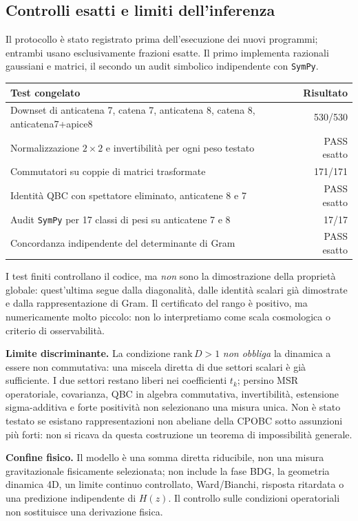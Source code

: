\documentclass[11pt,a4paper]{article}
\begin{document}
\subsection*{Controlli esatti e limiti dell'inferenza}
Il protocollo \`e stato registrato prima dell'esecuzione dei nuovi programmi; entrambi usano esclusivamente frazioni esatte. Il primo implementa razionali gaussiani e matrici, il secondo un audit simbolico indipendente con \texttt{SymPy}.
\begin{center}
\small
\begin{tabular}{p{8.4cm}r}
\toprule
Test congelato & Risultato\\
\midrule
Downset di anticatena 7, catena 7, anticatena 8, catena 8, anticatena7+apice8 & 530/530\\
Normalizzazione $2\times2$ e invertibilit\`a per ogni peso testato & PASS esatto\\
Commutatori su coppie di matrici trasformate & 171/171\\
Identit\`a QBC con spettatore eliminato, anticatene 8 e 7 & PASS esatto\\
Audit \texttt{SymPy} per 17 classi di pesi su anticatene 7 e 8 & 17/17\\
Concordanza indipendente del determinante di Gram & PASS esatto\\
\bottomrule
\end{tabular}
\end{center}
I test finiti controllano il codice, ma \emph{non} sono la dimostrazione della propriet\`a globale: quest'ultima segue dalla diagonalit\`a, dalle identit\`a scalari gi\`a dimostrate e dalla rappresentazione di Gram. Il certificato del rango \`e positivo, ma numericamente molto piccolo: non lo interpretiamo come scala cosmologica o criterio di osservabilit\`a.

\textbf{Limite discriminante.} La condizione $\mathrm{rank}\,D>1$ \emph{non obbliga} la dinamica a essere non commutativa: una miscela diretta di due settori scalari \`e gi\`a sufficiente. I due settori restano liberi nei coefficienti $t_k$; persino MSR operatoriale, covarianza, QBC in algebra commutativa, invertibilit\`a, estensione sigma-additiva e forte positivit\`a non selezionano una misura unica. Non \`e stato testato se esistano rappresentazioni non abeliane della CPOBC sotto assunzioni pi\`u forti: non si ricava da questa costruzione un teorema di impossibilit\`a generale.

\textbf{Confine fisico.} Il modello \`e una somma diretta riducibile, non una misura gravitazionale fisicamente selezionata; non include la fase BDG, la geometria dinamica 4D, un limite continuo controllato, Ward/Bianchi, risposta ritardata o una predizione indipendente di $H(z)$. Il controllo sulle condizioni operatoriali non sostituisce una derivazione fisica.
\end{document}
